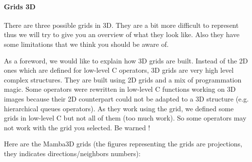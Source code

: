 \documentclass[a4paper,10pt,oneside]{article}
\begin{document}
\paragraph{Grids 3D}

There are three possible grids in 3D. They are a bit more
difficult to represent thus we will try to give you an overview
of what they look like. Also they have some limitations that we think you
should be aware of.

As a foreword, we would like to explain how 3D grids are built.
Instead of the 2D ones which are defined for low-level C operators, 3D
grids are very high level complex structures. They are built using 2D grids and
a mix of programmation magic. Some operators were rewritten in low-level C
functions working on 3D images because their 2D counterpart could not be adapted
to a 3D structure (e.g. hierarchical queues operators). As they work using the
grid, we defined some grids in low-level C but not all of them (too much work).
So some operators may not work with the grid you selected. Be warned !


Here are the Mamba3D grids (the figures representing the grids are projections,
they indicates directions/neighbors numbers):
\end{document}
